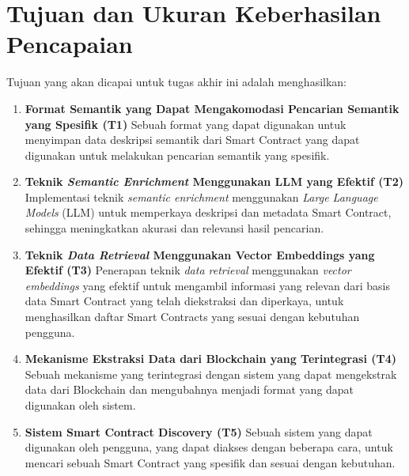 \section{Tujuan dan Ukuran Keberhasilan Pencapaian}
\label{sec:tujuan-ukuran-keberhasilan-pencapaian}


Tujuan yang akan dicapai untuk tugas akhir ini adalah menghasilkan:

\begin{enumerate}
	\item \textbf{Format Semantik yang Dapat Mengakomodasi Pencarian Semantik yang Spesifik (T1)} \newline
	      Sebuah format yang dapat digunakan untuk menyimpan data deskripsi semantik dari Smart Contract yang dapat digunakan untuk melakukan pencarian semantik yang spesifik.

	\item \textbf{Teknik \textit{Semantic Enrichment} Menggunakan LLM yang Efektif (T2)} \newline
	      Implementasi teknik \textit{semantic enrichment} menggunakan \textit{Large Language Models} (LLM) untuk memperkaya deskripsi dan metadata Smart Contract, sehingga meningkatkan akurasi dan relevansi hasil pencarian.

	\item \textbf{Teknik \textit{Data Retrieval} Menggunakan Vector Embeddings yang Efektif (T3)} \newline
	      Penerapan teknik \textit{data retrieval} menggunakan \textit{vector embeddings} yang efektif untuk mengambil informasi yang relevan dari basis data Smart Contract yang telah diekstraksi dan diperkaya, untuk menghasilkan daftar Smart Contracts yang sesuai dengan kebutuhan pengguna.

	\item \textbf{Mekanisme Ekstraksi Data dari Blockchain yang Terintegrasi (T4)} \newline
	      Sebuah mekanisme yang terintegrasi dengan sistem yang dapat mengekstrak data dari Blockchain dan mengubahnya menjadi format yang dapat digunakan oleh sistem.

	\item \textbf{Sistem Smart Contract Discovery (T5)} \newline
	      Sebuah sistem yang dapat digunakan oleh pengguna, yang dapat diakses dengan beberapa cara, untuk mencari sebuah Smart Contract yang spesifik dan sesuai dengan kebutuhan.

\end{enumerate}

